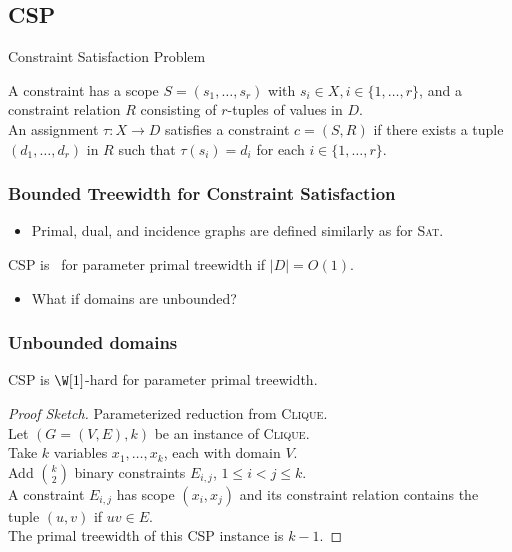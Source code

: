 \subsection{CSP}

\begin{frame}{Constraint Satisfaction Problem}
	
	
	\noindent
	A \alert{constraint} has a \alert{scope} $S=(s_1,\dots,s_r)$ with $s_i\in X, i\in \{1,\dots,r\}$, and a \alert{constraint relation} $R$ consisting of $r$-tuples of values in $D$.\\ An assignment $\tau: X\rightarrow D$ \alert{satisfies} a constraint $c=(S,R)$ if there exists a tuple $(d_1,\dots,d_r)$ in $R$ such that $\tau(s_i)=d_i$ for each $i\in \{1,\dots,r\}$.
\end{frame}

\begin{frame}
  \frametitle{Bounded Treewidth for Constraint Satisfaction}
  \begin{itemize}
  \item Primal, dual, and incidence graphs are defined similarly as for \textsc{Sat}.
  \end{itemize}
  \begin{theorem}
  	CSP is \FPT\ for parameter primal treewidth if $|D|=O(1)$.
  \end{theorem}
  \begin{itemize}
  \item What if domains are unbounded?
  \end{itemize}
\end{frame}

\begin{frame}
  \frametitle{Unbounded domains}
  \begin{theorem}
  	CSP is
      $\W[1]$-hard for parameter primal treewidth.
  \end{theorem}
  \pause
  \begin{proof}[Proof Sketch]
  	Parameterized reduction from \textsc{Clique}.\\
    Let $(G=(V,E),k)$  be an instance of \textsc{Clique}.\\
    Take $k$ variables $x_1,\dots,x_k$, each with domain $V$.\\
    Add $\binom{k}{2}$ binary constraints $E_{i,j}$, $1\leq i < j \leq k$.\\
    A constraint $E_{i,j}$ has scope $(x_i,x_j)$ and its constraint relation contains the tuple $(u,v)$ if $uv\in E$.\\
    The primal treewidth of this CSP instance is $k-1$.
  \end{proof}
\end{frame}


